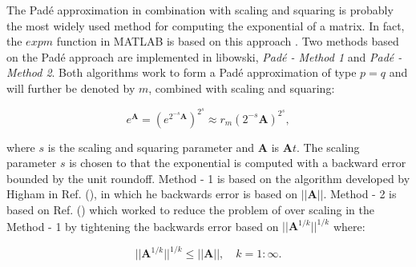 The Pad\'e approximation in combination with scaling and squaring is probably the most widely used method for computing the exponential of a matrix. In fact, the $expm$ function in MATLAB is based on this approach \cite{higham2009}. Two methods based on the Pad\'e approach are implemented in libowski, \textit{Pad\'e - Method 1} and \textit{Pad\'e - Method 2}. Both algorithms work to form a Pad\'e approximation of type $p = q$ and will further be denoted by $m$, combined with scaling and squaring:

\begin{equation}
    e^{\boldsymbol{A}} = (e^{2^{-s}\boldsymbol{A}})^{2^{s}} \approx r_{m}(2^{-s}\boldsymbol{A})^{2^{s}},
\end{equation}

\noindent where $s$ is the scaling and squaring parameter and $\boldsymbol{A}$ is $\boldsymbol{A}t$. The scaling parameter $s$ is chosen to that the exponential is computed with a backward error bounded by the unit roundoff.  Method - 1 is based on the algorithm developed by Higham in Ref. (\cite{higham2005}), in which he backwards error is based on $||\boldsymbol{A}||$. Method - 2 is based on Ref. (\cite{higham2009}) which worked to reduce the problem of over scaling in the Method - 1 by tightening the backwards error based on $||\boldsymbol{A}^{1/k}||^{1/k}$ where:

\begin{equation}
    ||\boldsymbol{A}^{1/k}||^{1/k} \leq ||\boldsymbol{A}||, \quad k = 1:\infty.
\end{equation}


   



